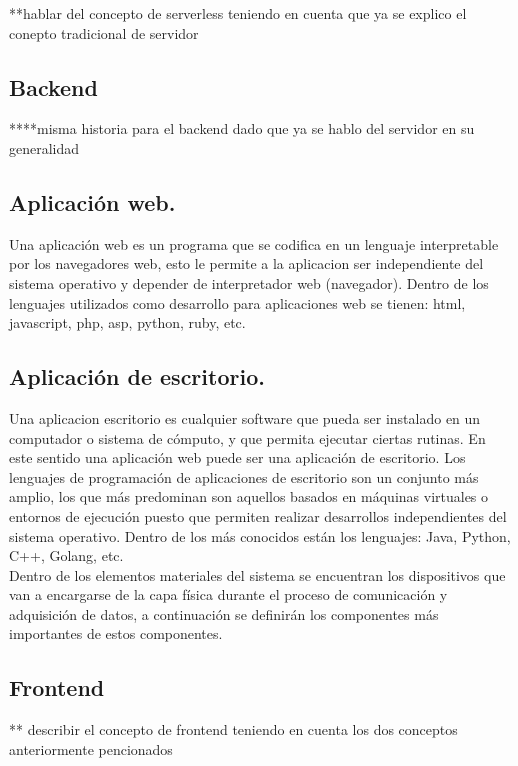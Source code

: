 **hablar del concepto de serverless teniendo en cuenta que ya se explico el conepto tradicional de servidor

\subsection{Backend}

****misma historia para el backend dado que ya se hablo del servidor en su generalidad


\subsection{Aplicación web.}

Una aplicación web es un programa que se codifica en un lenguaje interpretable por los navegadores web, esto le permite a la aplicacion ser independiente del sistema operativo y depender de interpretador web (navegador). Dentro de los lenguajes utilizados como desarrollo para aplicaciones web se tienen: html, javascript, php, asp, python, ruby, etc. 

\subsection{Aplicación de escritorio.} 

Una aplicacion escritorio es cualquier software que pueda ser instalado en un computador o sistema de cómputo, y que permita ejecutar ciertas rutinas. En este sentido una aplicación web puede ser una aplicación de escritorio. Los lenguajes de programación de aplicaciones de escritorio son un conjunto más amplio, los que más predominan son aquellos basados en máquinas virtuales o entornos de ejecución puesto que permiten realizar desarrollos independientes del sistema operativo. Dentro de los más conocidos están los lenguajes: Java, Python, C++, Golang, etc.
\vspace{0.5cm}\\
Dentro de los elementos materiales del sistema se encuentran los dispositivos que van a encargarse de la capa física durante el proceso de comunicación y adquisición de datos, a continuación se definirán los componentes más importantes de estos componentes.

\subsection{Frontend}

** describir el concepto de frontend teniendo en cuenta los dos conceptos anteriormente pencionados 

